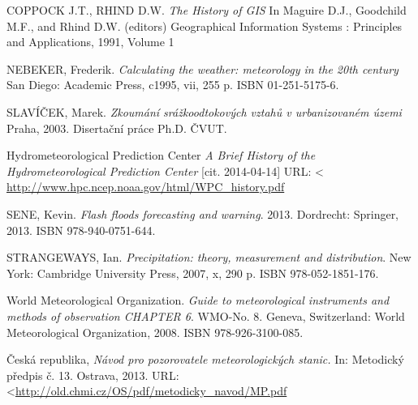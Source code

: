 \documentclass[a4paper,12pt,oneside]{report}
\begin{document}
\begin{thebibliography}{99}
\label{literatura}






COPPOCK J.T.,  RHIND D.W. \textit{The History of GIS}
In Maguire D.J., Goodchild M.F., and Rhind D.W. (editors) Geographical Information Systems : Principles and Applications, 1991, Volume 1

NEBEKER, Frederik. \textit{Calculating the weather: meteorology in the 20th century}
 San Diego: Academic Press, c1995, vii, 255 p. ISBN 01-251-5175-6. 

SLAVÍČEK, Marek. \textit{Zkoumání srážkoodtokových vztahů v urbanizovaném územi}
 Praha, 2003. Disertační práce Ph.D. ČVUT.


Hydrometeorological Prediction Center \textit{ A Brief History of the Hydrometeorological Prediction Center}
[cit. 2014-04-14] URL: \textless\url{ http://www.hpc.ncep.noaa.gov/html/WPC_history.pdf}


SENE, Kevin. \textit {Flash floods forecasting and warning}.
2013. Dordrecht: Springer, 2013. ISBN 978-940-0751-644. 

STRANGEWAYS, Ian.  \textit {Precipitation: theory, measurement and distribution}.
New York: Cambridge University Press, 2007, x, 290 p. ISBN 978-052-1851-176. 

World Meteorological Organization. \textit{Guide to meteorological instruments and methods of observation CHAPTER 6}. WMO-No. 8. Geneva, Switzerland: World Meteorological Organization, 2008. ISBN 978-926-3100-085. 



Česká republika, \textit{Návod pro pozorovatele meteorologických stanic.}
In: Metodický předpis č. 13. Ostrava, 2013. URL:\textless {\url{http://old.chmi.cz/OS/pdf/metodicky_navod/MP.pdf}}


\end{thebibliography}
\end{document}
